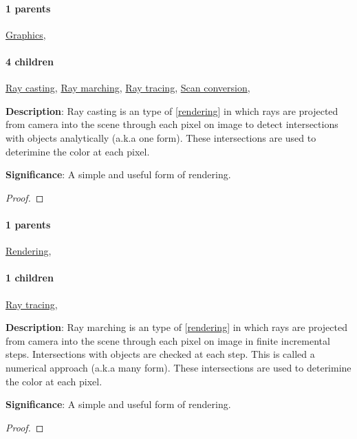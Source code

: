 \documentclass[./main.tex]{subfiles}
\begin{document}
\paragraph{1 parents} \hyperref[statement:Graphics]{Graphics}, 
\paragraph{4 children} \hyperref[statement:Ray casting]{Ray casting}, \hyperref[statement:Ray marching]{Ray marching}, \hyperref[statement:Ray tracing]{Ray tracing}, \hyperref[statement:Scan conversion]{Scan conversion}, 



\begin{statement}
\label{statement:Ray casting}\hspace*{0pt}\par
\end{statement}
\textbf{Description}:
Ray casting is an type of [\hyperref[statement:Rendering]{rendering}] in which rays are projected from camera into the scene through each pixel on image to detect intersections with objects analytically (a.k.a one form).
These intersections are used to deterimine the color at each pixel.
\par
{\color{magenta} \textbf{Significance}:
A simple and useful form of rendering.
\par}
\begin{proof}
\proofbydefinition
\end{proof}\par
\paragraph{1 parents} \hyperref[statement:Rendering]{Rendering}, 
\paragraph{1 children} \hyperref[statement:Ray tracing]{Ray tracing}, 



\begin{statement}
\label{statement:Ray marching}\hspace*{0pt}\par
\end{statement}
\textbf{Description}:
Ray marching is an type of [\hyperref[statement:Rendering]{rendering}] in which rays are projected from camera into the scene through each pixel on image in finite incremental steps.
Intersections with objects are checked at each step.
This is called a numerical approach (a.k.a many form).
These intersections are used to deterimine the color at each pixel.
\par
{\color{magenta} \textbf{Significance}:
A simple and useful form of rendering.
\par}
\begin{proof}
\proofbydefinition
\end{proof}\par
\end{document}
